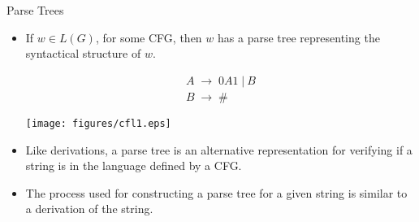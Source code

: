 \documentclass{prosper}%
\newcommand{\e} {{\mbox{$\epsilon$}}}
\newcommand{\ra}{\mbox{$\;\rightarrow\;$}}
\newcommand{\vb}{\mbox{$\;|\:$}}
\newcommand{\dra}{\mbox{$\;\Rightarrow\;$}}
\begin{document}
\begin{slide}{Parse Trees}

\begin{itemize}
\item If $w\in L(G)$, for some CFG, then $w$ has a {\blue parse tree} representing the {\blue syntactical structure} of $w$.
\begin{minipage}{4cm}
\[
\begin{array}{l}
A \ra 0A1\vb B\\
B\ra \#
\end{array}
\]
\end{minipage}
\begin{minipage}{5cm}
\texttt{[image: figures/cfl1.eps]}
\end{minipage}

\item Like derivations, a parse tree is an alternative representation for verifying if a string is in the language defined by a CFG.
\item The process used for constructing a parse tree for a given string is similar to a derivation of the string. 
\end{itemize}
\end{slide}

\begin{comment}
\begin{slide}{Constructing Parse Trees}
Let \cfg{G} be a CFG. A tree is a parse tree for $G$ if: 
\begin{itemize}
\item Each interior node is labelled by a variable in $V$. 
\item Each leaf is labelled by a symbol in $V\cup \Sigma\cup\{\e\}$. 
Any \e-labelled leaf is the only child of its parent. 
\item If an interior node is lablelled $A$, and its children (from left to right) are labelled 
\[
X_1, X_2,\cdots , X_k 
\]
then $A \ra X_1X_2\cdots  X_k \in R$
\end{itemize}
\begin{minipage}{6cm}
Example: given this grammar, construct two parse trees.
\end{minipage}
\begin{minipage}{4cm}
\[
\begin{array}{l}
A \ra 0A1\vb B\\
B\ra \epsilon \vb bB
\end{array}
\]
\end{minipage}

\end{slide}
\end{comment}
\end{document}
